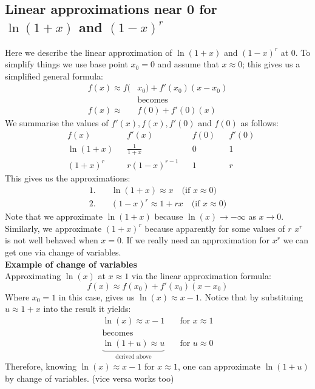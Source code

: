 \documentclass{report}
\begin{document}
\subsection{Linear approximations near 0 for\\$\ln(1+x)$ and $(1-x)^r$} %
Here we describe the linear approximation of $\ln(1+x)$ and $(1-x)^r$ at 0. 
To simplify things we use base point $x_0=0$ and assume that $x\approx 0$; this gives us 
a simplified general formula:
\begin{align*}
f(x)\approx f(&x_0)+f'(x_0)(x-x_0)\\
&\text{becomes}\\
f(x)\approx &f(0)+f'(0)(x)
\end{align*}
We summarise the values of $f'(x),f(x),f'(0)$ and $f(0)$ as follows:
\begin{align*}
&f(x)     & &f'(x)          & &f(0) & &f'(0)\\
&\ln(1+x) & &\frac{1}{1+x}  & &0    & &1\\
&(1+x)^r  & &r(1-x)^{r-1}   & &1    & &r
\end{align*}
This gives us the approximations:
\begin{align*}
1.&\quad\ln(1+x)\approx x\quad\text{(if $x\approx 0$)}\\
2.&\quad(1-x)^r\approx 1+rx\quad\text{(if $x\approx 0$)}
\end{align*}
Note that we approximate $\ln(1+x)$ because $\ln(x)\to -\infty$ as $x\to0$.
Similarly, we approximate $(1+x)^r$ because apparently for some values of $r$
$x^r$ is not well behaved when $x=0$. If we really need an approximation for $x^r$ 
we can get one via change of variables.\\
\textbf{Example of change of variables}\\
Approximating $\ln(x)$ at $x\approx 1$ via the linear approximation formula:
\begin{equation*}
f(x)\approx f(x_0)+f'(x_0)(x-x_0)
\end{equation*}
Where $x_0=1$ in this case, gives us $\ln(x)\approx x-1$. Notice that by substituing
$u\approx 1+x$ into the result it yields:
\begin{align*}
\ln(x)\approx x-1&\quad\text{for $x\approx 1$}\\
\text{becomes}\\
\underbrace{\ln(1+u)\approx u}_{\text{derived above}}&\quad\text{for $u\approx 0$}
\end{align*}
Therefore, knowing $\ln(x)\approx x-1$ for $x\approx1$, one can approximate $\ln(1+u)$ by change of variables. (vice versa works too)
\newpage
\end{document}
